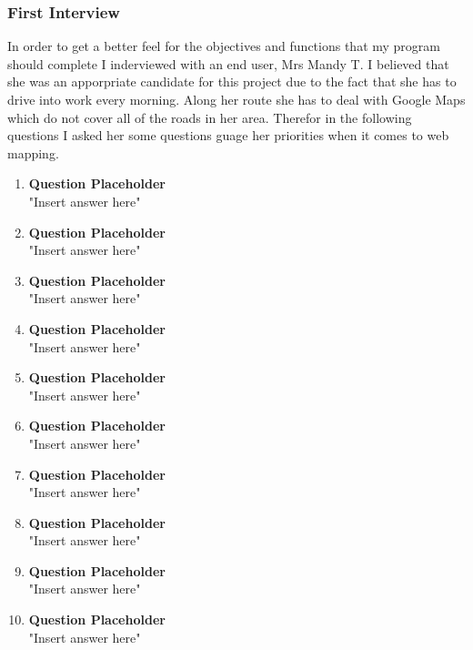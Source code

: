 \begin{flushleft}
            \subsubsection{First Interview}
            \large
            In order to get a better feel for the objectives and functions that my program should complete I inderviewed with an end user, Mrs Mandy T. I believed that she was an apporpriate candidate for this
            project due to the fact that she has to drive into work every morning. Along her route she has to deal with Google Maps which do not cover all of the roads in her area. Therefor in the following questions
            I asked her some questions guage her priorities when it comes to web mapping.
            \bk
            \begin{enumerate}
                \item {\large \bf{Question Placeholder}} \\
                \bk
                "Insert answer here"
                \item {\large \bf{Question Placeholder}} \\
                \bk
                "Insert answer here"
                \item {\large \bf{Question Placeholder}} \\
                \bk
                "Insert answer here"
                \item {\large \bf{Question Placeholder}} \\
                \bk
                "Insert answer here"
                \item {\large \bf{Question Placeholder}} \\
                \bk
                "Insert answer here"
                \item {\large \bf{Question Placeholder}} \\
                \bk
                "Insert answer here"
                \item {\large \bf{Question Placeholder}} \\
                \bk
                "Insert answer here"
                \item {\large \bf{Question Placeholder}} \\
                \bk
                "Insert answer here"
                \item {\large \bf{Question Placeholder}} \\
                \bk
                "Insert answer here"
                \item {\large \bf{Question Placeholder}} \\
                \bk
                "Insert answer here"
            \end{enumerate}
            

\end{flushleft}

